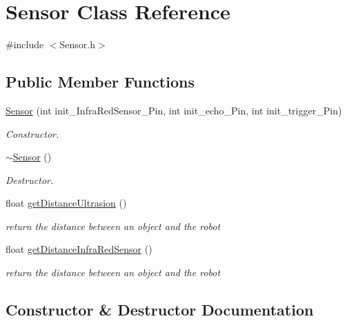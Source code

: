 \hypertarget{class_sensor}{}\section{Sensor Class Reference}
\label{class_sensor}


{\ttfamily \#include $<$Sensor.\+h$>$}

\subsection*{Public Member Functions}
\begin{DoxyCompactItemize}
\item 
\hyperlink{class_sensor_a1b5adfcfd7fbb82429d6841ff5981e5e}{Sensor} (int init\+\_\+\+Infra\+Red\+Sensor\+\_\+\+Pin, int init\+\_\+echo\+\_\+\+Pin, int init\+\_\+trigger\+\_\+\+Pin)
\begin{DoxyCompactList}\small\item\em Constructor. \end{DoxyCompactList}\item 
\hyperlink{class_sensor_aee8c70e7ef05ce65e7ee33686b5d7db2}{$\sim$\+Sensor} ()
\begin{DoxyCompactList}\small\item\em Destructor. \end{DoxyCompactList}\item 
float \hyperlink{class_sensor_ac52b531672dcadef0bc4993590d0c5d0}{get\+Distance\+Ultrasion} ()
\begin{DoxyCompactList}\small\item\em return the distance between an object and the robot \end{DoxyCompactList}\item 
float \hyperlink{class_sensor_acedff615de343a12574ea728ffd643b1}{get\+Distance\+Infra\+Red\+Sensor} ()
\begin{DoxyCompactList}\small\item\em return the distance between an object and the robot \end{DoxyCompactList}\end{DoxyCompactItemize}


\subsection{Constructor \& Destructor Documentation}
\mbox{\label{class_sensor_a1b5adfcfd7fbb82429d6841ff5981e5e}} 
